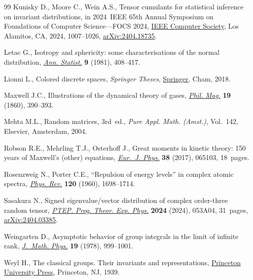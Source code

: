 \documentclass[pdftex]{sigma}
\numberwithin{equation}{section}
\theoremstyle{definition}
\begin{document}
\begin{thebibliography}{99}
Kunisky D., Moore C., Wein A.S., Tensor cumulants for statistical inference on
  invariant distributions, in 2024~{IEEE} 65th {A}nnual {S}ymposium on
  {F}oundations of {C}omputer {S}cience---{FOCS} 2024,
  \href{https://doi.org/10.1109/FOCS61266.2024.00067}{IEEE Computer Society},
  Los Alamitos, CA, 2024, 1007--1026,
  \href{http://arxiv.org/abs/2404.18735}{arXiv:2404.18735}.

Letac G., Isotropy and sphericity: some characterisations of the normal
  distribution, \href{https://doi.org/10.1214/aos/1176345406}{\textit{Ann.
  Statist.}} \textbf{9} (1981), 408--417.

Lionni L., Colored discrete spaces, \textit{Springer Theses},
  \href{https://doi.org/10.1007/978-3-319-96023-4}{Springer}, Cham, 2018.

Maxwell J.C., Illustrations of the dynamical theory of gases,
  \href{https://doi.org/10.1080/14786446008642818}{\textit{Phil. Mag.}}
  \textbf{19} (1860), 390--393.

Mehta M.L., Random matrices, 3rd~ed., \textit{Pure Appl. Math. (Amst.)}, Vol.~142, Elsevier, Amsterdam, 2004.

Robson R.E., Mehrling T.J., Osterhoff J., Great moments in kinetic theory: 150
  years of {M}axwell's (other) equations,
  \href{https://doi.org/10.1088/1361-6404/aa87d4}{\textit{Eur.~J. Phys.}}
  \textbf{38} (2017), 065103, 18~pages.

Rosenzweig N., Porter C.E., ``Repulsion of energy levels'' in complex atomic
  spectra, \href{https://doi.org/10.1103/PhysRev.120.1698}{\textit{Phys. Rev.}}
  \textbf{120} (1960), 1698--1714.

Sasakura N., Signed eigenvalue/vector distribution of complex order-three
  random tensor, \href{https://doi.org/10.1093/ptep/ptae062}{\textit{PTEP.
  Prog. Theor. Exp. Phys.}} \textbf{2024} (2024), 053A04, 31~pages,
  \href{http://arxiv.org/abs/2404.03385}{arXiv:2404.03385}.

Weingarten D., Asymptotic behavior of group integrals in the limit of infinite
  rank, \href{https://doi.org/10.1063/1.523807}{\textit{J.~Math. Phys.}}
  \textbf{19} (1978), 999--1001.

Weyl H., The classical groups. Their invariants and representations,
  \href{https://doi.org/10.2307/j.ctv3hh48t}{Princeton University Press},
  Princeton, NJ, 1939.

\end{thebibliography}\LastPageEnding
\end{document}
